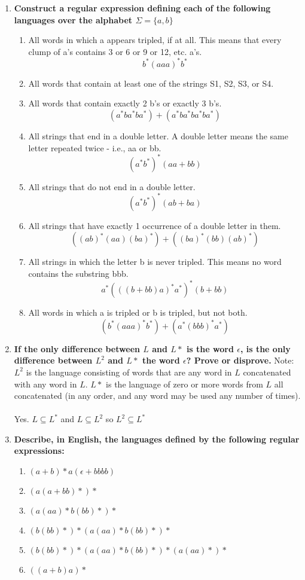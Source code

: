 
	
\begin{enumerate}
	
\item \textbf{Construct a regular expression defining each of the following languages over the alphabet $\Sigma = \{a, b\}$}

\begin{enumerate}
	\item All words in which a appears tripled, if at all. This means that every clump of a's contains 3 or 6 or 9 or 12, etc. a's.
	$$b^*(aaa)^*b^*$$
    \item All words that contain at least one of the strings S1, S2, S3, or S4.
    
    \item All words that contain exactly 2 b's or exactly 3 b's.
    $$(a^*ba^*ba^*) + (a^*ba^*ba^*ba^*)$$
    \item All strings that end in a double letter. A double letter means the same letter repeated twice - i.e., aa or bb.
    $$(a^*b^*)^*(aa + bb)$$
    \item All strings that do not end in a double letter.
    $$(a^*b^*)^*(ab + ba)$$
    \item All strings that have exactly 1 occurrence of a double letter in them.
    $$((ab)^*(aa)(ba)^*) + ((ba)^*(bb)(ab)^*)$$
    \item All strings in which  the letter b is never tripled. This means no word contains the substring bbb.
    $$ a^*(((b + bb)a)^*a^*) ^*(b + bb) $$
    \item All words in which a is tripled or b is tripled, but not both.
    $$ (b^*(aaa)^*b^*) + (a^*(bbb)^*a^*)  $$
\end{enumerate}
		

\newpage
\item \textbf{If the only difference between $L$ and $L*$ is the word $\epsilon$, is the only difference between $L^2$ and $L*$ the word $\epsilon$? Prove or disprove.}
Note: $ L^2$ is the language consisting of words that are any word in $L$ concatenated with any word in $L$. $L*$ is the language of zero or more words from $L$ all concatenated (in any order, and any word may be used any number of times).
\\\\
Yes.  $L \subseteq L^*$ and $L \subseteq L^2$  so $L^2 \subseteq L^*$ 

\newpage
\item \textbf{Describe, in English, the languages defined by the following regular expressions:}
\begin{enumerate}
  \item $(a+b)*a(\epsilon+bbbb)$
  \item $(a(a+bb)*)*$
  \item $(a(aa)*b(bb)*)*$
  \item $(b(bb)*)*(a(aa)*b(bb)*)*$
  \item $(b(bb)*)*(a(aa)*b(bb)*)*(a(aa)*)*$
  \item $((a+b)a)*$
\end{enumerate}


\end{enumerate}
